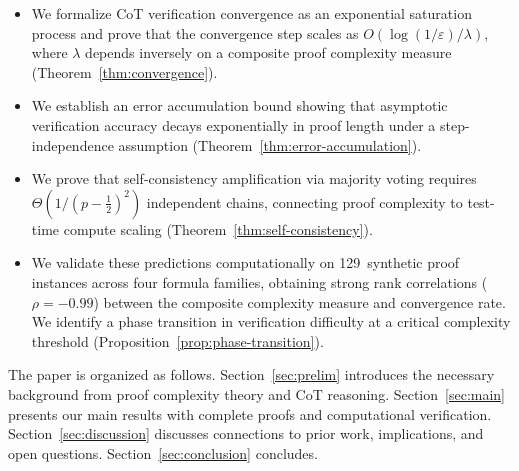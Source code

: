 \begin{itemize}[leftmargin=*,itemsep=2pt,topsep=4pt]
\item We formalize CoT verification convergence as an exponential saturation
  process and prove that the convergence step scales as
  $O(\log(1/\varepsilon)/\lambda)$, where $\lambda$ depends inversely on a
  composite proof complexity measure (Theorem~\ref{thm:convergence}).
\item We establish an error accumulation bound showing that asymptotic
  verification accuracy decays exponentially in proof length under a
  step-independence assumption (Theorem~\ref{thm:error-accumulation}).
\item We prove that self-consistency amplification via majority voting requires
  $\Theta(1/(p - \tfrac{1}{2})^2)$ independent chains, connecting proof
  complexity to test-time compute scaling
  (Theorem~\ref{thm:self-consistency}).
\item We validate these predictions computationally on 129~synthetic proof
  instances across four formula families, obtaining strong rank correlations
  ($\rho = -0.99$) between the composite complexity measure and convergence
  rate.  We identify a phase transition in verification difficulty at a critical
  complexity threshold (Proposition~\ref{prop:phase-transition}).
\end{itemize}

The paper is organized as follows.  Section~\ref{sec:prelim} introduces the
necessary background from proof complexity theory and CoT reasoning.
Section~\ref{sec:main} presents our main results with complete proofs and
computational verification.  Section~\ref{sec:discussion} discusses connections
to prior work, implications, and open questions.  Section~\ref{sec:conclusion}
concludes.
